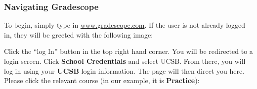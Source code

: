 \documentclass[
]{article}
\begin{document}
\hypertarget{navigating-gradescope}{%
\subsubsection{Navigating Gradescope}\label{navigating-gradescope}}

To begin, simply type in
\href{https://www.gradescope.com/}{www.gradescope.com}. If the user is
not already logged in, they will be greeted with the following image:

\begin{center}
\end{center}

Click the ``log In'' button in the top right hand corner. You will be
redirected to a login screen. Click \textbf{School Credentials} and
select UCSB. From there, you will log in using your \textbf{UCSB} login
information. The page will then direct you here. Please click the
relevant course (in our example, it is \textbf{Practice}):

\begin{center}
\end{center}
\end{document}
